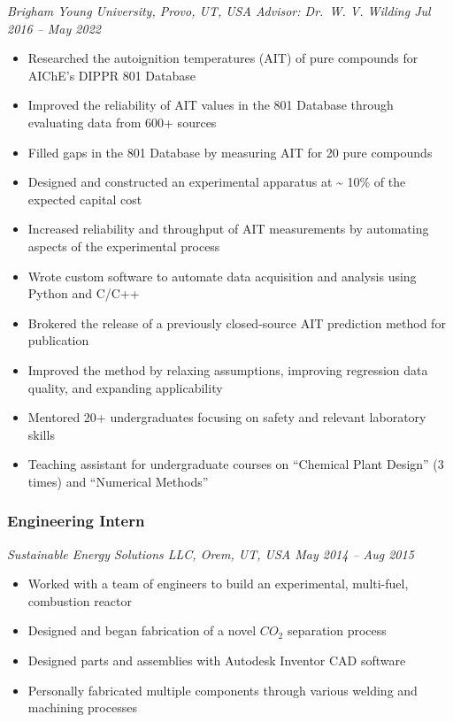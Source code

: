 \emph{Brigham Young University, Provo, UT, USA \textbar{} Advisor:
Dr.~W. V. Wilding \textbar{} Jul 2016 -- May 2022}

\begin{itemize}
\tightlist
\item
  Researched the autoignition temperatures (AIT) of pure compounds for
  AIChE's DIPPR 801 Database
\item
  Improved the reliability of AIT values in the 801 Database through
  evaluating data from 600+ sources
\item
  Filled gaps in the 801 Database by measuring AIT for 20 pure compounds
\item
  Designed and constructed an experimental apparatus at
  \textasciitilde{} 10\% of the expected capital cost
\item
  Increased reliability and throughput of AIT measurements by automating
  aspects of the experimental process
\item
  Wrote custom software to automate data acquisition and analysis using
  Python and C/C++
\item
  Brokered the release of a previously closed-source AIT prediction
  method for publication
\item
  Improved the method by relaxing assumptions, improving regression data
  quality, and expanding applicability
\item
  Mentored 20+ undergraduates focusing on safety and relevant laboratory
  skills
\item
  Teaching assistant for undergraduate courses on ``Chemical Plant
  Design'' (3 times) and ``Numerical Methods''
\end{itemize}

\subsubsection{Engineering Intern}\label{engineering-intern}

\emph{Sustainable Energy Solutions LLC, Orem, UT, USA \textbar{} May
2014 -- Aug 2015}

\begin{itemize}
\tightlist
\item
  Worked with a team of engineers to build an experimental, multi-fuel,
  combustion reactor
\item
  Designed and began fabrication of a novel \(CO_2\)\hspace{0pt}
  separation process
\item
  Designed parts and assemblies with Autodesk Inventor CAD software
\item
  Personally fabricated multiple components through various welding and
  machining processes
\end{itemize}

